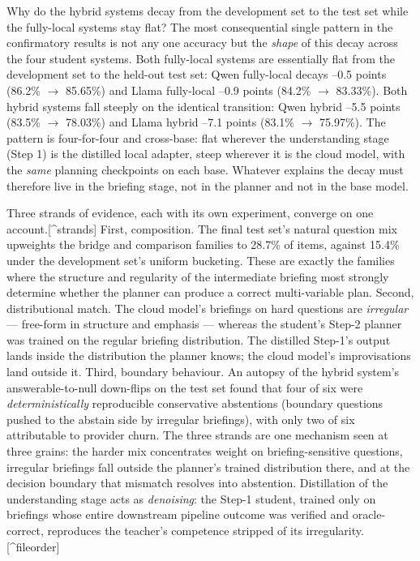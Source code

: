 Why do the hybrid systems decay from the development set to the test set while the fully-local systems stay flat? The most consequential single pattern in the confirmatory results is not any one accuracy but the \emph{shape} of this decay across the four student systems. Both fully-local systems are essentially flat from the development set to the held-out test set: Qwen fully-local decays --0.5 points (86.2\% $\rightarrow$ 85.65\%) and Llama fully-local --0.9 points (84.2\% $\rightarrow$ 83.33\%). Both hybrid systems fall steeply on the identical transition: Qwen hybrid --5.5 points (83.5\% $\rightarrow$ 78.03\%) and Llama hybrid --7.1 points (83.1\% $\rightarrow$ 75.97\%). The pattern is four-for-four and cross-base: flat wherever the understanding stage (Step 1) is the distilled local adapter, steep wherever it is the cloud model, with the \emph{same} planning checkpoints on each base. Whatever explains the decay must therefore live in the briefing stage, not in the planner and not in the base model.

Three strands of evidence, each with its own experiment, converge on one account.[\^{}strands] First, composition. The final test set's natural question mix upweights the bridge and comparison families to 28.7\% of items, against 15.4\% under the development set's uniform bucketing. These are exactly the families where the structure and regularity of the intermediate briefing most strongly determine whether the planner can produce a correct multi-variable plan. Second, distributional match. The cloud model's briefings on hard questions are \emph{irregular} --- free-form in structure and emphasis --- whereas the student's Step-2 planner was trained on the regular briefing distribution. The distilled Step-1's output lands inside the distribution the planner knows; the cloud model's improvisations land outside it. Third, boundary behaviour. An autopsy of the hybrid system's answerable-to-null down-flips on the test set found that four of six were \emph{deterministically} reproducible conservative abstentions (boundary questions pushed to the abstain side by irregular briefings), with only two of six attributable to provider churn. The three strands are one mechanism seen at three grains: the harder mix concentrates weight on briefing-sensitive questions, irregular briefings fall outside the planner's trained distribution there, and at the decision boundary that mismatch resolves into abstention. Distillation of the understanding stage acts as \emph{denoising}: the Step-1 student, trained only on briefings whose entire downstream pipeline outcome was verified and oracle-correct, reproduces the teacher's competence stripped of its irregularity.[\^{}fileorder]

